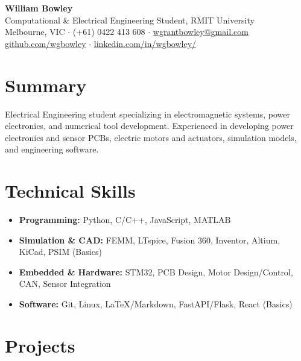 \documentclass[11pt,a4paper]{article}
\begin{document}
\begin{center}
{\LARGE \textbf{William Bowley}} \\[4pt]
{\large Computational \& Electrical Engineering Student, RMIT University} \\[2pt]
Melbourne, VIC \quad $\cdot$ \quad (+61) 0422 413 608 \quad $\cdot$ \quad \href{mailto:wgrantbowley@gmail.com}{wgrantbowley@gmail.com} \\[2pt]
\href{https://github.com/wgbowley}{github.com/wgbowley} \quad $\cdot$ \quad
\href{https://linkedin.com/in/wgbowley}{linkedin.com/in/wgbowley/}
\end{center}

\section*{Summary}
\noindent Electrical Engineering student specializing in electromagnetic systems, power electronics, 
and numerical tool development. Experienced in developing power electronics and sensor PCBs, 
electric motors and actuators, simulation models, and engineering software.

\section*{Technical Skills}
\begin{itemize}[leftmargin=*, noitemsep, topsep=0pt]
\item \textbf{Programming:} Python, C/C++, JavaScript, MATLAB
\item \textbf{Simulation \& CAD:} FEMM, LTspice, Fusion 360, Inventor, Altium, KiCad, PSIM (Basics)
\item \textbf{Embedded \& Hardware:} STM32, PCB Design, Motor Design/Control, CAN, Sensor Integration
\item \textbf{Software:} Git, Linux, LaTeX/Markdown, FastAPI/Flask, React (Basics)
\end{itemize}

\section*{Projects}
\end{document}
